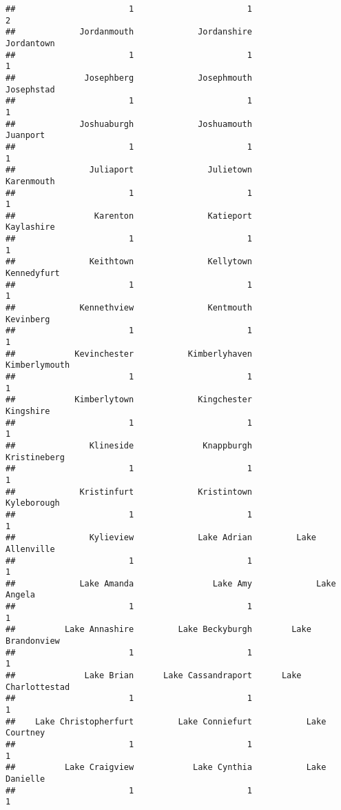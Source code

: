 \documentclass[
]{article}
\begin{document}
\begin{verbatim}
##                       1                       1                       2 
##             Jordanmouth             Jordanshire              Jordantown 
##                       1                       1                       1 
##              Josephberg             Josephmouth              Josephstad 
##                       1                       1                       1 
##             Joshuaburgh             Joshuamouth                Juanport 
##                       1                       1                       1 
##               Juliaport               Julietown              Karenmouth 
##                       1                       1                       1 
##                Karenton               Katieport              Kaylashire 
##                       1                       1                       1 
##               Keithtown               Kellytown             Kennedyfurt 
##                       1                       1                       1 
##             Kennethview               Kentmouth               Kevinberg 
##                       1                       1                       1 
##            Kevinchester           Kimberlyhaven           Kimberlymouth 
##                       1                       1                       1 
##            Kimberlytown             Kingchester               Kingshire 
##                       1                       1                       1 
##               Klineside              Knappburgh            Kristineberg 
##                       1                       1                       1 
##             Kristinfurt             Kristintown             Kyleborough 
##                       1                       1                       1 
##               Kylieview             Lake Adrian         Lake Allenville 
##                       1                       1                       1 
##             Lake Amanda                Lake Amy             Lake Angela 
##                       1                       1                       1 
##          Lake Annashire         Lake Beckyburgh        Lake Brandonview 
##                       1                       1                       1 
##              Lake Brian      Lake Cassandraport      Lake Charlottestad 
##                       1                       1                       1 
##    Lake Christopherfurt         Lake Conniefurt           Lake Courtney 
##                       1                       1                       1 
##          Lake Craigview            Lake Cynthia           Lake Danielle 
##                       1                       1                       1 

\end{verbatim}
\end{document}
